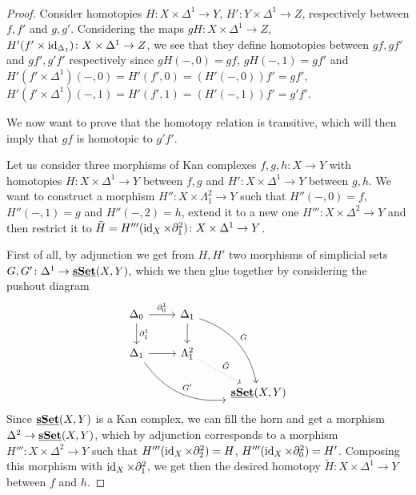 \documentclass[a4paper,11pt,openany]{scrartcl}
\begin{document}
~\\
\begin{proof}
    Consider homotopies $H\colon X\times\Delta^1\rightarrow Y$, $H'\colon
    Y\times\Delta^1\rightarrow Z$, respectively between $f,f'$ and $g,g'$.
    Considering the maps $gH\colon X\times\Delta^1\rightarrow Z$,
    $H'(f'\times\operatorname{id}_{\Delta_1})\colon X\times\Delta^1\rightarrow Z$, we see that
    they define homotopies between $gf,gf'$ and $gf',g'f'$ respectively since
    $gH(-,0)=gf$, $gH(-,1)=gf'$ and
    $H'(f'\times\Delta^1)(-,0)=H'(f',0)=(H'(-,0))f'=gf'$,
    $H'(f'\times\Delta^1)(-,1)=H'(f',1)=(H'(-,1))f'=g'f'$.

    We now want to prove that the homotopy relation is transitive, which will
    then imply that $gf$ is homotopic to $g'f'$.

    Let us consider three morphisms of Kan complexes $f,g,h\colon X\rightarrow
    Y$ with homotopies $H\colon X\times\Delta^1\rightarrow Y$ between $f,g$ and
    $H'\colon X\times\Delta^1\rightarrow Y$ between $g,h$. We want to construct a morphism
    $H''\colon X\times\Lambda^2_1\rightarrow Y$ such that $H''(-,0)=f$,
    $H''(-,1)=g$ and $H''(-,2)=h$, extend it to a new one $H'''\colon
    X\times\Delta^2\rightarrow Y$ and then restrict it to
    $\tilde{H}=H'''(\operatorname{id}_X\times\partial^2_1)\colon X\times\Delta^1\rightarrow Y$.

    First of all, by adjunction we get from $H,H'$ two morphisms of simplicial
    sets $G,G'\colon\Delta^1\rightarrow\underline{\operatorname{\mathbf{sSet}}}(X,Y)$, which we then glue together by
    considering the pushout diagram
    \[
        \begin{tikzcd}
            \Delta_0\ar[r, "\partial_0^1"]\ar[d, "\partial_1^1"]
            & \Delta_1\ar[d]\ar[ddr, bend left, "G"] \\
            \Delta_1\ar[r]\ar[drr, bend right, "G'"]
            & \Lambda_1^2\ar[dr, dotted, "\tilde{G}"] \\
            && \underline{\sSet}(X,Y)
        \end{tikzcd}
    \]
    Since $\operatorname{\underline{\mathbf{sSet}}}(X,Y)$ is a Kan complex, we can fill the horn and get a morphism
    $\Delta^2\rightarrow\operatorname{\underline{\mathbf{sSet}}}(X,Y)$, which by adjunction corresponds to a
    morphism $H'''\colon X\times\Delta^2\rightarrow Y$ such that
    $H'''(\operatorname{id}_X\times\partial^2_2)=H$, $H'''(\operatorname{id}_X\times\partial^2_0)=H'$.
    Composing this morphism with
    $\operatorname{id}_X\times\partial^2_1$, we get then the desired homotopy $\tilde{H}\colon
    X\times\Delta^1\rightarrow Y$ between $f$ and $h$.
\end{proof}
\end{document}
